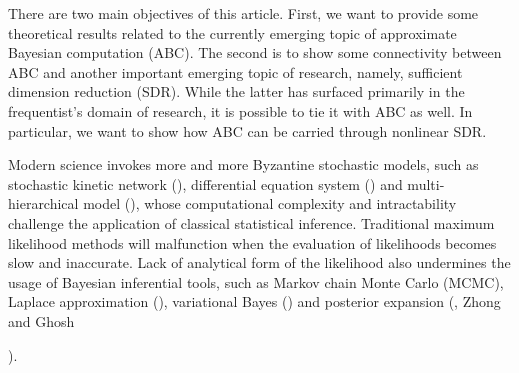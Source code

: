 \documentclass[oneside,english]{amsbook}
\numberwithin{section}{chapter}
\numberwithin{equation}{section}
\numberwithin{figure}{section}
\theoremstyle{plain}
\theoremstyle{plain}
\theoremstyle{definition}
\theoremstyle{plain}
\theoremstyle{plain}
\theoremstyle{remark}
\theoremstyle{definition}
\theoremstyle{definition}
\begin{document}
There are two main objectives of this article. First, we want to provide
some theoretical results related to the currently emerging topic of
approximate Bayesian computation (ABC). The second is to show some
connectivity between ABC and another important emerging topic of research,
namely, sufficient dimension reduction (SDR). While the latter has
surfaced primarily in the{} frequentist's{}
domain of research, it is possible to tie it with ABC as well. In
particular, we want to show how ABC can be carried through nonlinear
SDR. 

Modern science invokes more and more Byzantine stochastic models,
such as stochastic kinetic network (\citet{wilkinson2011stochastic}),
differential equation system (\citet{picchini2014inference}) and
multi-hierarchical model (\citet{jasra2012filtering}), whose computational
complexity and intractability challenge the application of classical
statistical inference. Traditional maximum likelihood methods will
malfunction when the evaluation of likelihoods becomes slow and inaccurate.
Lack of analytical form of the likelihood also  {undermines
} the usage of Bayesian inferential tools, such as Markov chain Monte
Carlo (MCMC), Laplace approximation (\citet{tierney1986accurate}),
variational Bayes (\citet{jaakkola2000bayesian}) and posterior expansion
(\citet{johnson1970asymptotic}, Zhong and Ghosh%

). 
\end{document}
